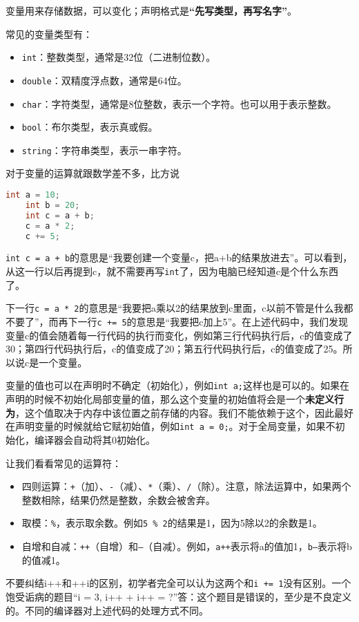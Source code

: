 \documentclass[../main.tex]{subfiles}
\begin{document}
变量用来存储数据，可以变化；声明格式是\textbf{“先写类型，再写名字”}。

常见的变量类型有：
\begin{itemize}
  \item \texttt{int}：整数类型，通常是32位（二进制位数）。
  \item \texttt{double}：双精度浮点数，通常是64位。
  \item \texttt{char}：字符类型，通常是8位整数，表示一个字符。也可以用于表示整数。
  \item \texttt{bool}：布尔类型，表示真或假。
  \item \texttt{string}：字符串类型，表示一串字符。
\end{itemize}

对于变量的运算就跟数学差不多，比方说
\begin{lstlisting}[language=C++]
    int a = 10;
    int b = 20;
    int c = a + b;
    c = a * 2;
    c += 5;
\end{lstlisting}
\texttt{int c = a + b}的意思是“我要创建一个变量c，把a+b的结果放进去”。可以看到，从这一行以后再提到c，就不需要再写\texttt{int}了，因为电脑已经知道c是个什么东西了。

下一行\texttt{c = a * 2}的意思是“我要把a乘以2的结果放到c里面，c以前不管是什么我都不要了”，而再下一行\texttt{c += 5}的意思是“我要把c加上5”。在上述代码中，我们发现变量c的值会随着每一行代码的执行而变化，例如第三行代码执行后，c的值变成了30；第四行代码执行后，c的值变成了20；第五行代码执行后，c的值变成了25。所以说c是一个变量。

变量的值也可以在声明时不确定（初始化），例如\texttt{int a;}这样也是可以的。如果在声明的时候不初始化局部变量的值，那么这个变量的初始值将会是一个\textbf{未定义行为}，这个值取决于内存中该位置之前存储的内容。我们不能依赖于这个，因此最好在声明变量的时候就给它赋初始值，例如\texttt{int a = 0;}。对于全局变量，如果不初始化，编译器会自动将其0初始化。

让我们看看常见的运算符：
\begin{itemize}
  \item 四则运算：\texttt{+}（加）、\texttt{-}（减）、\texttt{*}（乘）、\texttt{/}（除）。注意，除法运算中，如果两个整数相除，结果仍然是整数，余数会被舍弃。
  \item 取模：\texttt{\%}，表示取余数。例如\texttt{5 \% 2}的结果是1，因为5除以2的余数是1。
  \item 自增和自减：\texttt{++}（自增）和\texttt{--}（自减）。例如，\texttt{a++}表示将a的值加1，\texttt{b--}表示将b的值减1。
\end{itemize}
不要纠结i++和++i的区别，初学者完全可以认为这两个和\texttt{i += 1}没有区别。一个饱受诟病的题目“i = 3, i++ + i++ = ?”答：这个题目是错误的，至少是不良定义的。不同的编译器对上述代码的处理方式不同。
\end{document}
